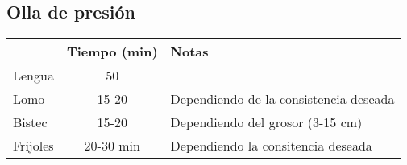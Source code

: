 \subsection{Olla de presi\'on}

\begin{table}[H]
  \begin{tabular}{l | c | l}
    & Tiempo (min) & Notas \\
    \hline
    Lengua     & 50 &  \\
    Lomo    & 15-20  & Dependiendo de la consistencia deseada \\
    Bistec        & 15-20  & Dependiendo del grosor (3-15 cm) \\
    Frijoles  & 20-30 min & Dependiendo la consitencia deseada 
  \end{tabular}
  \end{table}
